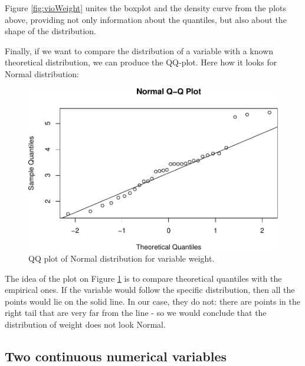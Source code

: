 \documentclass[
]{book}
\newenvironment{Shaded}{\begin{snugshade}}{\end{snugshade}}
\newcommand{\FunctionTok}[1]{\textcolor[rgb]{0.13,0.29,0.53}{\textbf{#1}}}
\newcommand{\NormalTok}[1]{#1}
\newcommand{\SpecialCharTok}[1]{\textcolor[rgb]{0.81,0.36,0.00}{\textbf{#1}}}
\theoremstyle{definition}
\theoremstyle{definition}
\theoremstyle{definition}
\theoremstyle{definition}
\theoremstyle{remark}
\begin{document}
Figure \ref{fig:vioWeight} unites the boxplot and the density curve from the plots above, providing not only information about the quantiles, but also about the shape of the distribution.

Finally, if we want to compare the distribution of a variable with a known theoretical distribution, we can produce the QQ-plot. Here how it looks for Normal distribution:

\begin{Shaded}
\end{Shaded}

\begin{figure}
\centering
\includegraphics{Svetunkov---Statistics-for-Business-Analytics_files/figure-latex/QQWeight-1.pdf}
\caption{\label{fig:QQWeight}QQ plot of Normal distribution for variable weight.}
\end{figure}

The idea of the plot on Figure \ref{fig:QQWeight} is to compare theoretical quantiles with the empirical ones. If the variable would follow the specific distribution, then all the points would lie on the solid line. In our case, they do not: there are points in the right tail that are very far from the line - so we would conclude that the distribution of weight does not look Normal.

\subsection{Two continuous numerical variables}\label{two-continuous-numerical-variables}
\end{document}
